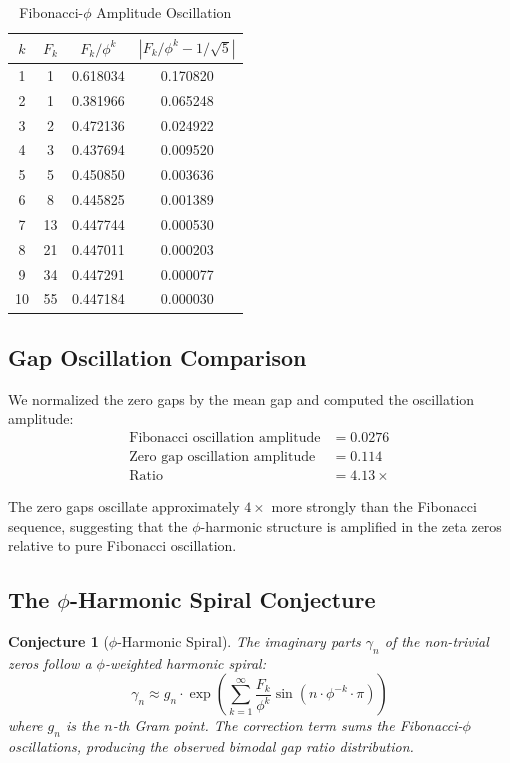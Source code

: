 \documentclass[11pt,a4paper]{article}
\newtheorem{conjecture}[theorem]{Conjecture}
\begin{document}
\begin{table}[H]
\centering
\caption{Fibonacci-$\phi$ Amplitude Oscillation}
\label{tab:fib_amp}
\begin{tabular}{@{}cccc@{}}
\toprule
$k$ & $F_k$ & $F_k/\phi^k$ & $|F_k/\phi^k - 1/\sqrt{5}|$ \\
\midrule
1 & 1  & 0.618034 & 0.170820 \\
2 & 1  & 0.381966 & 0.065248 \\
3 & 2  & 0.472136 & 0.024922 \\
4 & 3  & 0.437694 & 0.009520 \\
5 & 5  & 0.450850 & 0.003636 \\
6 & 8  & 0.445825 & 0.001389 \\
7 & 13 & 0.447744 & 0.000530 \\
8 & 21 & 0.447011 & 0.000203 \\
9 & 34 & 0.447291 & 0.000077 \\
10& 55 & 0.447184 & 0.000030 \\
\bottomrule
\end{tabular}
\end{table}

\subsection{Gap Oscillation Comparison}

We normalized the zero gaps by the mean gap and computed the oscillation amplitude:
\begin{align*}
\text{Fibonacci oscillation amplitude} &= 0.0276 \\
\text{Zero gap oscillation amplitude} &= 0.114 \\
\text{Ratio} &= 4.13\times
\end{align*}

The zero gaps oscillate approximately $4\times$ more strongly than the Fibonacci sequence, suggesting that the $\phi$-harmonic structure is amplified in the zeta zeros relative to pure Fibonacci oscillation.

\subsection{The $\phi$-Harmonic Spiral Conjecture}

\begin{conjecture}[$\phi$-Harmonic Spiral]
\label{conj:spiral}
The imaginary parts $\gamma_n$ of the non-trivial zeros follow a $\phi$-weighted harmonic spiral:
\begin{equation}
\gamma_n \approx g_n \cdot \exp\left(\sum_{k=1}^{\infty} \frac{F_k}{\phi^k} \sin(n \cdot \phi^{-k} \cdot \pi)\right)
\end{equation}
where $g_n$ is the $n$-th Gram point. The correction term sums the Fibonacci-$\phi$ oscillations, producing the observed bimodal gap ratio distribution.
\end{conjecture}
\end{document}
